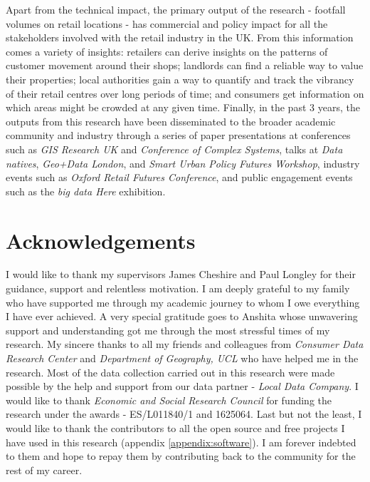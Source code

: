 Apart from the technical impact, the primary output of the research - footfall volumes on retail locations - has commercial and policy impact for all the stakeholders involved with the retail industry in the UK.
From this information comes a variety of insights: retailers can derive insights on the patterns of customer movement around their shops; landlords can find a reliable way to value their properties; local authorities gain a way to quantify and track the vibrancy of their retail centres over long periods of time; and consumers get information on which areas might be crowded at any given time.
Finally, in the past 3 years, the outputs from this research have been disseminated to the broader academic community and industry through a series of paper presentations at conferences such as \textit{GIS Research UK} and \textit{Conference of Complex Systems}, talks at \textit{Data natives}, \textit{Geo+Data London}, and \textit{Smart Urban Policy Futures Workshop}, industry events such as \textit{Oxford Retail Futures Conference}, and public engagement events such as the \textit{big data Here} exhibition.

\section*{Acknowledgements} 

I would like to thank my supervisors James Cheshire and Paul Longley for their guidance, support and relentless motivation.
I am deeply grateful to my family who have supported me through my academic journey to whom I owe everything I have ever achieved.
A very special gratitude goes to Anshita whose unwavering support and understanding got me through the most stressful times of my research.
My sincere thanks to all my friends and colleagues from \textit{Consumer Data Research Center} and \textit{Department of Geography, UCL} who have helped me in the research.
Most of the data collection carried out in this research were made possible by the help and support from our data partner - \textit{Local Data Company}.
I would like to thank \textit{Economic and Social Research Council} for funding the research under the awards - ES/L011840/1 and 1625064.
Last but not the least, I would like to thank the contributors to all the open source and free projects I have used in this research (appendix \ref{appendix:software}). I am forever indebted to them and hope to repay them by contributing back to the community for the rest of my career.
